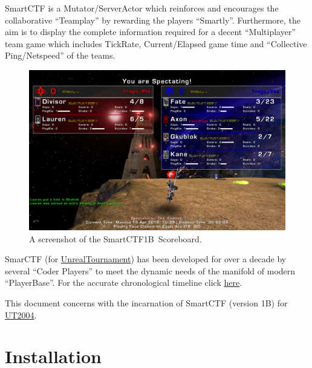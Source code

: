 \documentclass{article}
\newcommand{\SmartVersion}{1B}
\begin{document}
SmartCTF is a Mutator/ServerActor which reinforces and encourages the collaborative ``Teamplay'' by rewarding the players ``Smartly''.  Furthermore, the aim is to display the complete information required for a decent ``Multiplayer'' team game which includes TickRate, Current/Elapsed game time and ``Collective Ping/Netspeed'' of the teams.

\begin{figure}
\centering
\label{fig:smartscoreboard}
\includegraphics[width=1.1\textwidth]{img}
\caption{A screenshot of the SmartCTF\SmartVersion~Scoreboard.}
\end{figure}

SmarCTF (for \href{https://en.wikipedia.org/wiki/Unreal_Tournament}{\color{Blue}UnrealTournament}) has been developed for over a decade by several ``Coder Players'' to meet the dynamic needs of the manifold of modern ``PlayerBase''.  For the accurate chronological timeline click \href{http://wiki.unrealadmin.org/SmartCTF}{{\color{Blue}here}}.

This document concerns with the incarnation of SmartCTF (version \SmartVersion) for \href{https://en.wikipedia.org/wiki/Unreal_Tournament_2004}{{\color{Blue}UT2004}}. 

\section{Installation}
\end{document}
